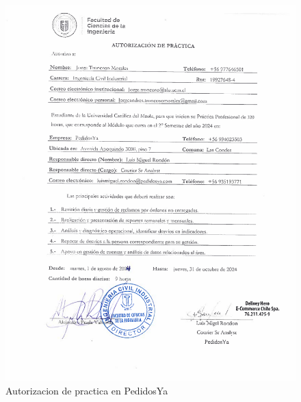 \begin{figure}[h!] %
\begin{flushleft}
  \includegraphics[width=\linewidth]{figures/autorizacion_practica.pdf}
\end{flushleft}
\caption{Autorizacion de practica en PedidosYa}
\label{fig: autorizacion_practica}
\end{figure}
